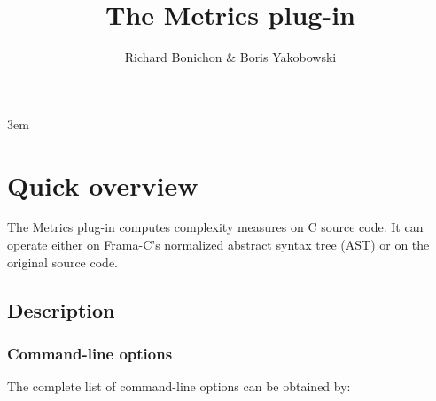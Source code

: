 \documentclass{frama-c-book}
\title{The Metrics plug-in}
\author{Richard Bonichon \& Boris Yakobowski}
\begin{document}
\sloppy
\emergencystretch 3em

\maketitle
\tableofcontents

\chapter{Quick overview}
\label{cha:quick-overview}

The Metrics plug-in computes complexity measures on C source code.
It can operate either on Frama-C's normalized abstract syntax tree  (AST) or on
the original source code.

\section{Description}
\label{sec:description}

\subsection{Command-line options}
\label{sec:cli-options}

The complete list of command-line options can be obtained by:
\begin{shell}
\end{shell}
\end{document}
